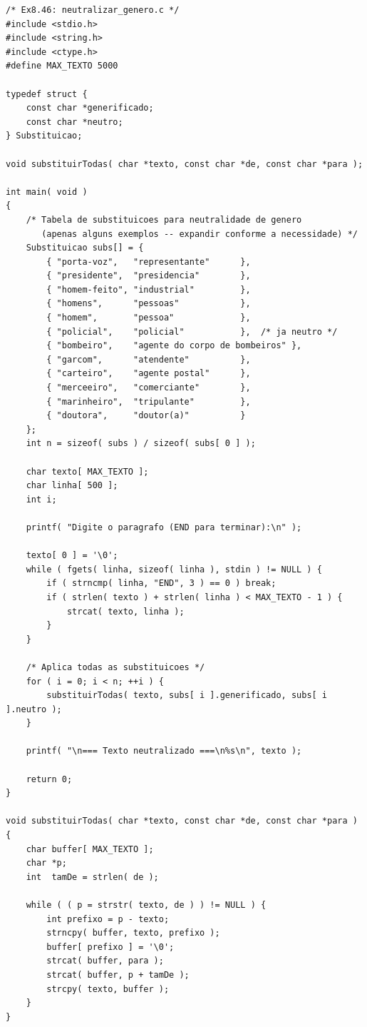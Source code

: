 \documentclass[12pt,a4paper]{article}
\begin{document}
\begin{respostabox}
\begin{lstlisting}
/* Ex8.46: neutralizar_genero.c */
#include <stdio.h>
#include <string.h>
#include <ctype.h>
#define MAX_TEXTO 5000

typedef struct {
    const char *generificado;
    const char *neutro;
} Substituicao;

void substituirTodas( char *texto, const char *de, const char *para );

int main( void )
{
    /* Tabela de substituicoes para neutralidade de genero
       (apenas alguns exemplos -- expandir conforme a necessidade) */
    Substituicao subs[] = {
        { "porta-voz",   "representante"      },
        { "presidente",  "presidencia"        },
        { "homem-feito", "industrial"         },
        { "homens",      "pessoas"            },
        { "homem",       "pessoa"             },
        { "policial",    "policial"           },  /* ja neutro */
        { "bombeiro",    "agente do corpo de bombeiros" },
        { "garcom",      "atendente"          },
        { "carteiro",    "agente postal"      },
        { "merceeiro",   "comerciante"        },
        { "marinheiro",  "tripulante"         },
        { "doutora",     "doutor(a)"          }
    };
    int n = sizeof( subs ) / sizeof( subs[ 0 ] );

    char texto[ MAX_TEXTO ];
    char linha[ 500 ];
    int i;

    printf( "Digite o paragrafo (END para terminar):\n" );

    texto[ 0 ] = '\0';
    while ( fgets( linha, sizeof( linha ), stdin ) != NULL ) {
        if ( strncmp( linha, "END", 3 ) == 0 ) break;
        if ( strlen( texto ) + strlen( linha ) < MAX_TEXTO - 1 ) {
            strcat( texto, linha );
        }
    }

    /* Aplica todas as substituicoes */
    for ( i = 0; i < n; ++i ) {
        substituirTodas( texto, subs[ i ].generificado, subs[ i ].neutro );
    }

    printf( "\n=== Texto neutralizado ===\n%s\n", texto );

    return 0;
}

void substituirTodas( char *texto, const char *de, const char *para )
{
    char buffer[ MAX_TEXTO ];
    char *p;
    int  tamDe = strlen( de );

    while ( ( p = strstr( texto, de ) ) != NULL ) {
        int prefixo = p - texto;
        strncpy( buffer, texto, prefixo );
        buffer[ prefixo ] = '\0';
        strcat( buffer, para );
        strcat( buffer, p + tamDe );
        strcpy( texto, buffer );
    }
}
\end{lstlisting}
\end{respostabox}
\end{document}

